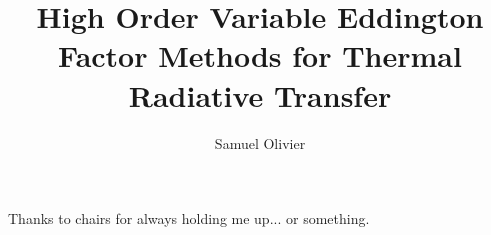 \documentclass{dissertation}
\begin{document}
\title{High Order Variable Eddington Factor Methods for Thermal Radiative Transfer}
\author{Samuel Olivier}
\maketitle

\copyrightpage

\begin{abstract}

\end{abstract}

\begin{frontmatter}

\begin{KeepFromToc}
\tableofcontents
\end{KeepFromToc}
\clearpage

\printglossary[style=april_gloss_style]
\clearpage


\begin{acknowledgements}
Thanks to chairs for always holding me up... or something. 
\end{acknowledgements}
\end{frontmatter}

\pagestyle{headings}









\appendix 


\clearpage
\printbibliography
\end{document}
